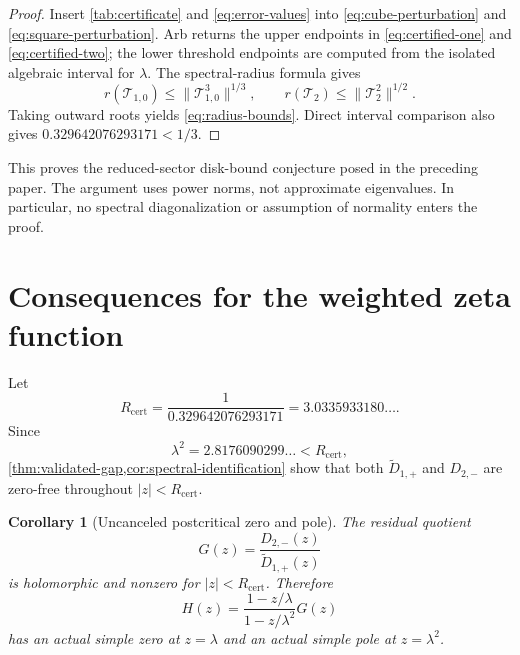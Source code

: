 \documentclass[11pt]{article}
\newtheorem{corollary}[theorem]{Corollary}
\theoremstyle{definition}
\theoremstyle{remark}
\newcommand{\cT}{\mathcal T}
\begin{document}
\begin{proof}
Insert \cref{tab:certificate} and \eqref{eq:error-values} into
\eqref{eq:cube-perturbation} and \eqref{eq:square-perturbation}.  Arb returns the upper
endpoints in \eqref{eq:certified-one} and \eqref{eq:certified-two}; the lower threshold
endpoints are computed from the isolated algebraic interval for $\lambda$.
The spectral-radius formula gives
\begin{equation}\label{eq:power-radius}
 r(\cT_{1,0})\le\|\cT_{1,0}^3\|^{1/3},
 \qquad
 r(\cT_2)\le\|\cT_2^2\|^{1/2}.
\end{equation}
Taking outward roots yields \eqref{eq:radius-bounds}.  Direct interval
comparison also gives $0.329642076293171<1/3$.
\end{proof}

This proves the reduced-sector disk-bound conjecture posed in the preceding
paper.  The argument uses power norms, not approximate eigenvalues.  In
particular, no spectral diagonalization or assumption of normality enters the
proof.

\section{Consequences for the weighted zeta function}
\label{sec:consequences}

Let
\begin{equation}\label{eq:certified-disk-radius}
 R_{\mathrm{cert}}
 =\frac1{0.329642076293171}
 =3.0335933180\ldots.
\end{equation}
Since
\begin{equation}\label{eq:lambda-square}
 \lambda^2=2.8176090299\ldots<R_{\mathrm{cert}},
\end{equation}
\cref{thm:validated-gap,cor:spectral-identification} show that both
$\widetilde D_{1,+}$ and $D_{2,-}$ are zero-free throughout
$|z|<R_{\mathrm{cert}}$.

\begin{corollary}[Uncanceled postcritical zero and pole]
\label{cor:zero-pole}
The residual quotient
\begin{equation}\label{eq:G-again}
 G(z)=\frac{D_{2,-}(z)}{\widetilde D_{1,+}(z)}
\end{equation}
is holomorphic and nonzero for $|z|<R_{\mathrm{cert}}$.  Therefore
\begin{equation}\label{eq:H-final}
 H(z)=\frac{1-z/\lambda}{1-z/\lambda^2}G(z)
\end{equation}
has an actual simple zero at $z=\lambda$ and an actual simple pole at
$z=\lambda^2$.
\end{corollary}
\end{document}
